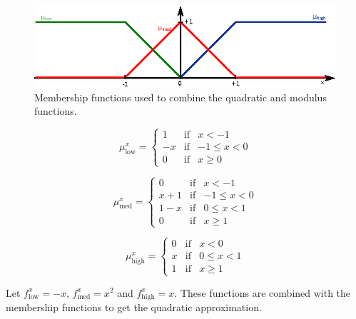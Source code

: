 \begin{figure}[h!]
	\centering
	\includegraphics[width=0.9\linewidth]{modulus/images/fuzzy}
	\caption[Membership functions for the quadratic approx. of the \textit{modulus}]{Membership functions used to combine the quadratic and modulus functions.}
	\label{fig:fuzzy}
\end{figure}

\begin{equation}
\label{eq:mulow}
\mu^x_{\text{low}}= \left\{ \begin{array}{lcc}
1 &   \text{if}  & x < -1 \\
-x & \text{if}  & -1 \leq x < 0 \\
0 &  \text{if} & x \geq 0
\end{array}
\right.
\end{equation}

\begin{equation}
\label{eq:mumid}
\mu^x_{\text{med}}= \left\{ \begin{array}{lcc}
0 &   \text{if}  & x < -1 \\
x+1 & \text{if}  & -1 \leq x < 0 \\
1-x & \text{if}  & 0 \leq x < 1 \\
0 &  \text{if} & x \geq 1
\end{array}
\right.
\end{equation}

\begin{equation}
\label{eq:muhigh}
\mu^x_{\text{high}}= \left\{ \begin{array}{lcc}
0 &   \text{if}  & x < 0 \\
x & \text{if}  & 0 \leq x < 1 \\
1 &  \text{if} & x \geq 1
\end{array}
\right.
\end{equation}

Let $f^x_{\text{low}}=-x$, $f^x_{\text{med}}=x^2$ and $f^x_{\text{high}}=x$. These functions are combined with the membership functions to get the quadratic approximation.

